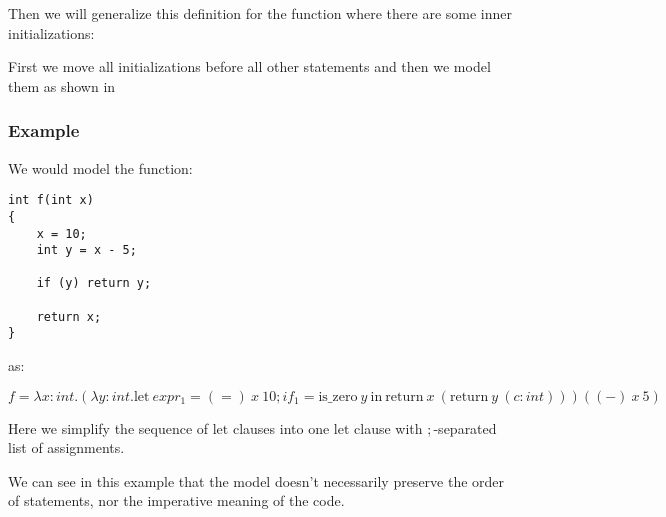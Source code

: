 Then we will generalize this definition for the function where there are some inner initializations:

First we move all initializations before all other statements and then we model them as shown in %

\subsubsection{Example}

We would model the function:

\begin{lstlisting}
int f(int x)
{
	x = 10;
	int y = x - 5;

	if (y) return y;

	return x;
}
\end{lstlisting}

as:

$f = \lambda x : int . (\lambda y : int . \text{let}\ expr_1 = (=)\ x\ 10; if_1 = \text{is\_zero}\ y\ \text{in}\ \text{return}\ x\ (\text{return}\ y\ (c : int))) ((-)\ x\ 5)$

Here we simplify the sequence of $\text{let}$ clauses into one $\text{let}$ clause with $;$-separated list of assignments.

We can see in this example that the model doesn't necessarily preserve the order of statements, nor the imperative meaning of the code.
